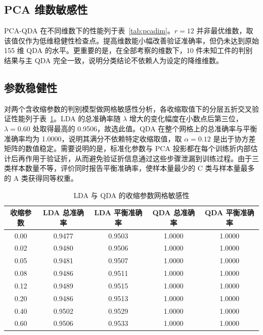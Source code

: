 \documentclass[12pt,a4paper]{article}
\newcommand{\upcite}[1]{\cite{#1}}
\begin{document}
\subsection{PCA 维数敏感性}

PCA-QDA 在不同维数下的性能列于表~\ref{tab:pcadim}。$r=12$ 并非最优维数，取该值仅作为低维稳健性检查点。提高维数能小幅改善验证准确率，但仍未达到原始 155 维 QDA 的水平。更重要的是，在全部考察的维数下，10 件未知工件的判别结果与主 QDA 完全一致，说明分类结论不依赖人为设定的降维维数。

\begin{table}[H]
\centering
\caption{PCA-QDA 在不同主成分维数下的性能}
\label{tab:pcadim}
\end{table}

\subsection{参数稳健性}

对两个含收缩参数的判别模型做网格敏感性分析，各收缩取值下的分层五折交叉验证性能列于表~\ref{tab:shrink}。LDA 的总准确率随 $\lambda$ 增大的变化幅度在小数点后第三位，$\lambda=0.60$ 处取得最高的 0.9506，故选此值。QDA 在整个网格上的总准确率与平衡准确率均为 1.0000，说明其满分不依赖特定收缩取值，取 $\alpha=0.12$ 是出于协方差矩阵的数值稳定。需要说明的是，标准化参数与 PCA 投影都在每个训练折内部估计后再作用于验证折，从而避免验证折信息通过这些步骤泄漏到训练过程\upcite{cawley2010}。由于三类样本数量不等，评价同时报告平衡准确率，使样本量最少的 C 类与样本量最多的 A 类获得同等权重\upcite{brodersen2010}。

\begin{table}[H]
\centering
\caption{LDA 与 QDA 的收缩参数网格敏感性}
\label{tab:shrink}
\begin{tabular}{ccccc}
\toprule
收缩参数 & LDA 总准确率 & LDA 平衡准确率 & QDA 总准确率 & QDA 平衡准确率 \\
\midrule
0.00 & 0.9477 & 0.9503 & 1.0000 & 1.0000 \\
0.02 & 0.9480 & 0.9506 & 1.0000 & 1.0000 \\
0.05 & 0.9481 & 0.9507 & 1.0000 & 1.0000 \\
0.08 & 0.9486 & 0.9511 & 1.0000 & 1.0000 \\
0.12 & 0.9489 & 0.9515 & 1.0000 & 1.0000 \\
0.20 & 0.9486 & 0.9513 & 1.0000 & 1.0000 \\
0.40 & 0.9502 & 0.9529 & 1.0000 & 1.0000 \\
0.60 & 0.9506 & 0.9533 & 1.0000 & 1.0000 \\
\bottomrule
\end{tabular}
\end{table}
\end{document}
